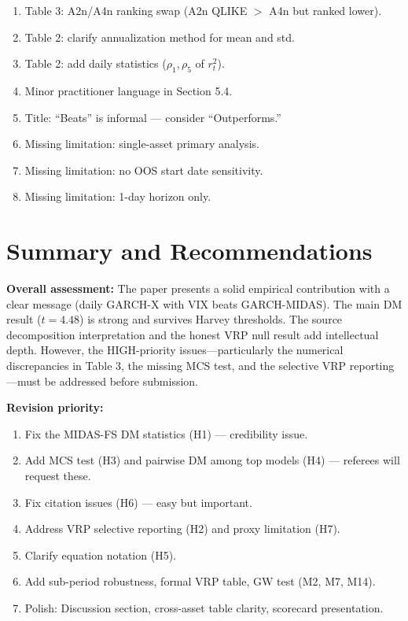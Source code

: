 \documentclass[12pt,a4paper]{article}
\begin{document}
\begin{enumerate}[label=L\arabic*.]
\item Table 3: A2n/A4n ranking swap (A2n QLIKE $> $ A4n but ranked lower).
\item Table 2: clarify annualization method for mean and std.
\item Table 2: add daily statistics ($\rho_1, \rho_5$ of $r_t^2$).
\item Minor practitioner language in Section 5.4.
\item Title: ``Beats'' is informal --- consider ``Outperforms.''
\item Missing limitation: single-asset primary analysis.
\item Missing limitation: no OOS start date sensitivity.
\item Missing limitation: 1-day horizon only.
\end{enumerate}


\section*{Summary and Recommendations}

\textbf{Overall assessment:} The paper presents a solid empirical contribution with a clear message (daily GARCH-X with VIX beats GARCH-MIDAS). The main DM result ($t = 4.48$) is strong and survives Harvey thresholds. The source decomposition interpretation and the honest VRP null result add intellectual depth. However, the HIGH-priority issues---particularly the numerical discrepancies in Table 3, the missing MCS test, and the selective VRP reporting---must be addressed before submission.

\textbf{Revision priority:}
\begin{enumerate}
\item Fix the MIDAS-FS DM statistics (H1) --- credibility issue.
\item Add MCS test (H3) and pairwise DM among top models (H4) --- referees will request these.
\item Fix citation issues (H6) --- easy but important.
\item Address VRP selective reporting (H2) and proxy limitation (H7).
\item Clarify equation notation (H5).
\item Add sub-period robustness, formal VRP table, GW test (M2, M7, M14).
\item Polish: Discussion section, cross-asset table clarity, scorecard presentation.
\end{enumerate}
\end{document}
